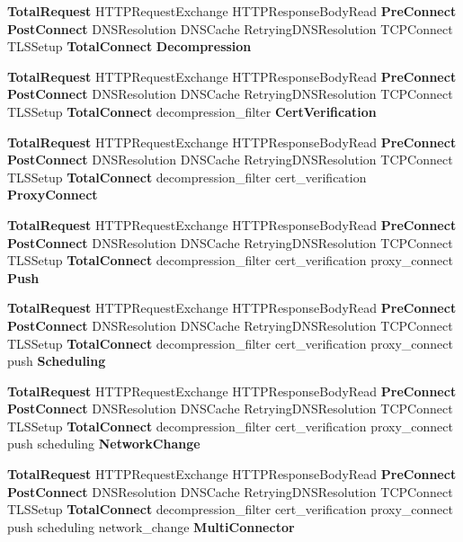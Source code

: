 \begin{DoxyCompactItemize}
\item 
{\bf Total\+Request} H\+T\+T\+P\+Request\+Exchange H\+T\+T\+P\+Response\+Body\+Read {\bf Pre\+Connect} {\bf Post\+Connect} D\+N\+S\+Resolution D\+N\+S\+Cache Retrying\+D\+N\+S\+Resolution T\+C\+P\+Connect T\+L\+S\+Setup {\bf Total\+Connect} {\bf Decompression}
\item 
{\bf Total\+Request} H\+T\+T\+P\+Request\+Exchange H\+T\+T\+P\+Response\+Body\+Read {\bf Pre\+Connect} {\bf Post\+Connect} D\+N\+S\+Resolution D\+N\+S\+Cache Retrying\+D\+N\+S\+Resolution T\+C\+P\+Connect T\+L\+S\+Setup {\bf Total\+Connect} decompression\+\_\+filter {\bf Cert\+Verification}
\item 
{\bf Total\+Request} H\+T\+T\+P\+Request\+Exchange H\+T\+T\+P\+Response\+Body\+Read {\bf Pre\+Connect} {\bf Post\+Connect} D\+N\+S\+Resolution D\+N\+S\+Cache Retrying\+D\+N\+S\+Resolution T\+C\+P\+Connect T\+L\+S\+Setup {\bf Total\+Connect} decompression\+\_\+filter cert\+\_\+verification {\bf Proxy\+Connect}
\item 
{\bf Total\+Request} H\+T\+T\+P\+Request\+Exchange H\+T\+T\+P\+Response\+Body\+Read {\bf Pre\+Connect} {\bf Post\+Connect} D\+N\+S\+Resolution D\+N\+S\+Cache Retrying\+D\+N\+S\+Resolution T\+C\+P\+Connect T\+L\+S\+Setup {\bf Total\+Connect} decompression\+\_\+filter cert\+\_\+verification proxy\+\_\+connect {\bf Push}
\item 
{\bf Total\+Request} H\+T\+T\+P\+Request\+Exchange H\+T\+T\+P\+Response\+Body\+Read {\bf Pre\+Connect} {\bf Post\+Connect} D\+N\+S\+Resolution D\+N\+S\+Cache Retrying\+D\+N\+S\+Resolution T\+C\+P\+Connect T\+L\+S\+Setup {\bf Total\+Connect} decompression\+\_\+filter cert\+\_\+verification proxy\+\_\+connect push {\bf Scheduling}
\item 
{\bf Total\+Request} H\+T\+T\+P\+Request\+Exchange H\+T\+T\+P\+Response\+Body\+Read {\bf Pre\+Connect} {\bf Post\+Connect} D\+N\+S\+Resolution D\+N\+S\+Cache Retrying\+D\+N\+S\+Resolution T\+C\+P\+Connect T\+L\+S\+Setup {\bf Total\+Connect} decompression\+\_\+filter cert\+\_\+verification proxy\+\_\+connect push scheduling {\bf Network\+Change}
\item 
{\bf Total\+Request} H\+T\+T\+P\+Request\+Exchange H\+T\+T\+P\+Response\+Body\+Read {\bf Pre\+Connect} {\bf Post\+Connect} D\+N\+S\+Resolution D\+N\+S\+Cache Retrying\+D\+N\+S\+Resolution T\+C\+P\+Connect T\+L\+S\+Setup {\bf Total\+Connect} decompression\+\_\+filter cert\+\_\+verification proxy\+\_\+connect push scheduling network\+\_\+change {\bf Multi\+Connector}
\item 

\end{DoxyCompactItemize}
